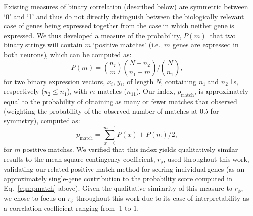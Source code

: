 \documentclass[10pt,letterpaper]{article}
\begin{document}
{Existing measures of binary correlation (described below) are symmetric between `0' and `1' and thus do not directly distinguish between the biologically relevant case of genes being expressed together from the case in which neither gene is expressed.
We thus developed a measure of the probability, $P(m)$, that two binary strings will contain $m$ `positive matches' (i.e., $m$ genes are expressed in both neurons), which can be computed as:
\begin{equation} \label{eqn:positiveMatch}
    P(m) = \binom{n_2}{m} \binom{N-n_2}{n_1-m} / \binom{N}{n_1},
\end{equation}
for two binary expression vectors, $x_i$, $y_i$, of length $N$, containing $n_1$ and $n_2$ 1s, respectively ($n_2 \leq n_1$), with $m$ matches ($n_{11}$).
Our index, $p_\mathrm{match}$, is approximately equal to the probability of obtaining as many or fewer matches than observed (weighting the probability of the observed number of matches at 0.5 for symmetry), computed as:
\begin{equation} \label{eqn:pmatch}
     p_\mathrm{match} = \sum_{x=0}^{m-1} P(x) + P(m)/2,
\end{equation}
for $m$ positive matches.
We verified that this index yields qualitatively similar results to the mean square contingency coefficient, $r_\phi$, used throughout this work, validating our related positive match method for scoring individual genes (as an approximately single-gene contribution to the probability score computed in Eq.~\ref{eqn:pmatch} above).
Given the qualitative similarity of this measure to $r_\phi$, we chose to focus on $r_\phi$ throughout this work due to its ease of interpretability as a correlation coefficient ranging from -1 to 1.

}
\end{document}
